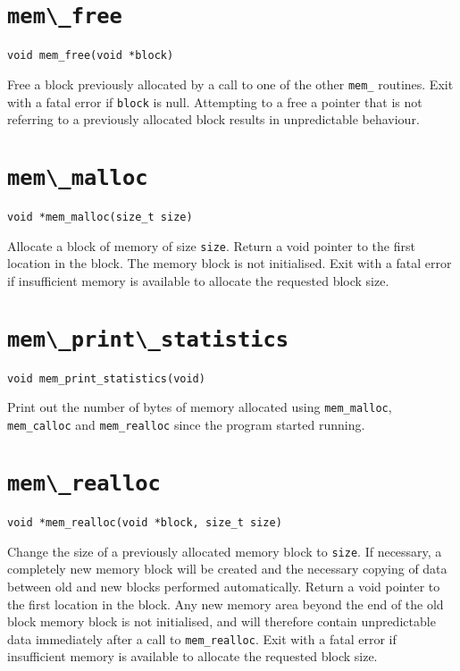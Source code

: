 \section{\protect\verb+mem\_free+}
\begin{verbatim}
void mem_free(void *block)
\end{verbatim}
Free a block previously allocated by a call to one of the other
\verb+mem_+ routines. Exit with a fatal error if {\tt block} is null.
Attempting to a free a pointer that is not referring to a previously
allocated block results in unpredictable behaviour.

\section{\protect\verb+mem\_malloc+}
\begin{verbatim}
void *mem_malloc(size_t size)
\end{verbatim}
Allocate a block of memory of size
{\tt size}. Return a void pointer to the
first location in the block. The memory block is not initialised.
Exit with a fatal error if insufficient
memory is available to allocate the requested block size.

\section{\protect\verb+mem\_print\_statistics+}
\begin{verbatim}
void mem_print_statistics(void)
\end{verbatim}
Print out the number of bytes of memory allocated using
\verb+mem_malloc+, \verb+mem_calloc+ and \verb+mem_realloc+ since the
program started running.

\section{\protect\verb+mem\_realloc+}
\begin{verbatim}
void *mem_realloc(void *block, size_t size)
\end{verbatim}
Change the size of a previously allocated memory block to {\tt size}. If
necessary, a completely new memory block will be created and the
necessary copying of data between old and new blocks performed
automatically. Return a void pointer to the first location in the block.
Any new memory area beyond the end of the old block  memory block is not
initialised, and will therefore contain unpredictable data immediately
after a call to {\tt mem\_realloc}. Exit with a fatal error if
insufficient memory is available to allocate the requested block size.

